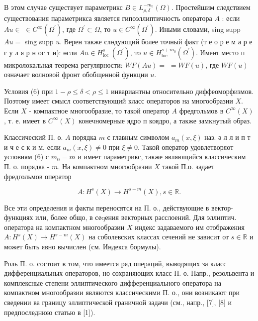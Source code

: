 \documentclass[10pt]{article}
\begin{document}
В этом случае существует параметрикс $B \in L_{\rho, \delta}^{-m_{0}}(\Omega)$. Простейшим следствием существования параметрикса является гипоэллиптичность оператора $A$ : если $A u \in$ $\in C^{\infty}\left(\Omega^{\prime}\right)$, где $\Omega^{\prime} \subset \Omega$, то $u \in C^{\infty}\left(\Omega^{\prime}\right)$. Иными словами, sing supp $A u=$ sing supp $u$. Верен также слөдующий более точный факт (т е о р е м а р е г у л я р н ос т и): өсли $A u \in H_{\text {loc }}^{s}\left(\Omega^{\prime}\right)$, то $u \in H_{\mathrm{loc}}^{s+m_{0}}\left(\Omega^{\prime}\right)$. Имеөт место п микролокальная теорема регулярности: $W F(A u)=$ $=W F(u)$, где $W F(u)$ означает волновой фронт обобщенной функции $u$.



Условия (6) при $1-\rho \leqslant \delta<\rho \leqslant 1$ инвариантны относительно диффеоморфизмов. Поэтому имеет смысл соответствующий класс операторов на многообразии $X$. Если $X$ - компактное многообразие, то такой оператор $A$ фредгольмов в $C^{\infty}(X)$, т. е. имеет в $C^{\infty}(X)$ конечномерные ядро п коядро, а также замкнутый образ.



Классический П. о. $A$ порядка $m$ с главным символом $a_{m}(x, \xi)$ наз. ә л л и п т и ч е с к и м, если $a_{m}(x, \xi) \neq 0$ при $\xi \neq 0$. Такой оператор удовлетворяөт условиям (6) с $m_{0}=m$ и имеет параметрикс, также являющийся классическим П. о. порядка - $m$. На компактном многообразии $X$ такой П.о. задает фредгольмов оператор



\[

A: H^{s}(X) \rightarrow H^{s-m}(X), s \in \mathbb{R} .

\]



Все эти определения и факты переносятся на П. о., действующие в вектор-функциях или, более общо, в сеqения векторных расслоений. Для эллиптич. оператора на компактном многообразии $X$ индекс задаваемого им отображения $A: H^{s}(X) \rightarrow H^{s-m}(X)$ на соболевских классах сечений не зависит от $s \in \mathbb{R}$ и может быть явно вычислен (см. Индекса бормулы).



Роль П. о. состоит в том, что имеется ряд операций, выводящих за класс дифференциальных операторов, но сохраняющих класс П. о. Напр., резольвента и комплексные степени эллиптического дифференциального оператора на компактном многообразии являются классическими П. о., они возникают при сведении ва границу эллиптической граничной задачи (см., напр., [7], [8] и предпоследнюю статью в [1]).
\end{document}
